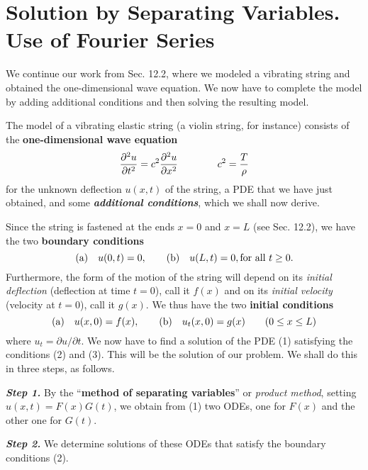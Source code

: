 \documentclass[12pt, leqno, oneside]{amsart}
\begin{document}
\section{Solution by Separating Variables.\\
Use of Fourier Series}

We continue our work from Sec. 12.2, where we modeled a vibrating string and 
obtained the one-dimensional wave equation. We now have to complete the model 
by adding additional conditions and then solving the resulting model.

The model of a vibrating elastic string (a violin string, for instance)
consists of the \textbf{one-dimensional wave equation}
\begin{equation}
    \frac{\partial^2{u}}{\partial{t^2}} = c^2\frac{\partial^2{u} \\
        }{\partial{x^2}} \qquad \qquad c^2 = \frac{T}{\rho}
\end{equation}
for the unknown deflection $u(x,t)$ of the string, a PDE that we have just 
obtained, and some \textbf{\emph{additional conditions}}, which we shall now 
derive.

Since the string is fastened at the ends $x=0$ and $x=L$ (see Sec. 12.2), we 
have the two \textbf{boundary conditions}
\begin{equation}
    \text{(a)} \quad u(0,t) = 0, \qquad \text{(b)} \quad u(L,t) = 0, \qquad \\
        \text{for all } t \geq 0.
\end{equation}
Furthermore, the form of the motion of the string will depend on its
\emph{initial deflection} (deflection at time $t=0$), call it $f(x)$ and on 
its \emph{initial velocity} (velocity at $t=0$), call it $g(x)$.
We thus have the two \textbf{initial conditions}
\begin{equation}
    \text{(a)} \quad u(x,0) = f(x), \qquad \text{(b)} \quad u_t(x,0) = g(x) \\
        \qquad (0 \leq x \leq L)
\end{equation}
where $u_t=\partial u/\partial t$. We now have to find a solution of the PDE 
(1) satisfying the conditions (2) and (3). This will be the solution of our 
problem. We shall do this in three steps, as follows.

\emph{\textbf{Step 1.}} By the “\textbf{method of separating variables}” or
\emph{product method}, setting $u(x,t)=F(x)G(t)$, we obtain from (1) two 
ODEs, one for $F(x)$ and the other one for $G(t)$.

\emph{\textbf{Step 2.}} We determine solutions of these ODEs that satisfy 
the boundary conditions (2).
\end{document}
